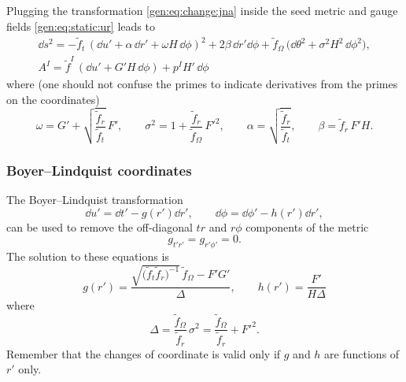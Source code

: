 Plugging the transformation \eqref{gen:eq:change:jna} inside the seed metric and gauge fields \eqref{gen:eq:static:ur} leads to\footnotemark{}%
\begin{subequations}
\label{gen:eq:rotating:ur}
\begin{gather}
	\dd s^2 = - \tilde f_t\, (\dd u' + \alpha\, \dd r' + \omega H\, \dd\phi )^2
		+ 2 \beta\, \dd r' \dd \phi
		+ \tilde f_\Omega\, \big(\dd\theta^2 + \sigma^2 H^2\, \dd\phi^2 \big), \\
	A^I = \tilde f^I\, (\dd u' + G' H\, \dd \phi) + p^I H'\, \dd\phi
\end{gather}
\end{subequations}
where (one should not confuse the primes to indicate derivatives from the primes on the coordinates)
\begin{equation}
	\omega = G' + \sqrt{\frac{\tilde f_r}{\tilde f_t}}\, F', \qquad
	\sigma^2 = 1 + \frac{\tilde f_r}{\tilde f_\Omega}\, F'^2, \qquad
	\alpha = \sqrt{\frac{\tilde f_r}{\tilde f_t}}, \qquad
	\beta = \tilde f_r\, F' H.
\end{equation} 


\subsubsection{Boyer--Lindquist coordinates}


The Boyer--Lindquist transformation
\begin{equation}
	\label{gen:eq:change:bl}
	\dd u' = \dd t' - g(r') \dd r', \qquad
	\dd \phi = \dd \phi' - h(r') \dd r',
\end{equation} 
can be used to remove the off-diagonal $tr$ and $r\phi$ components of the metric
\begin{equation}
	g_{t'r'} = g_{r'\phi'} = 0.
\end{equation} 
The solution to these equations is
\begin{equation}
	\label{gen:eq:change:bl:solution-gh}
	g(r') = \frac{\sqrt{\big(\tilde f_t \tilde f_r \big)^{-1}}\, \tilde f_\Omega - F' G'}{\Delta}, \qquad
	h(r') = \frac{F'}{H \Delta}
\end{equation} 
where
\begin{equation}
	\label{gen:eq:change:bl:delta}
	\Delta = \frac{\tilde f_\Omega}{\tilde f_r}\, \sigma^2
		= \frac{\tilde f_\Omega}{\tilde f_r} + F'^2.
\end{equation} 
Remember that the changes of coordinate is valid only if $g$ and $h$ are functions of $r'$ only.

